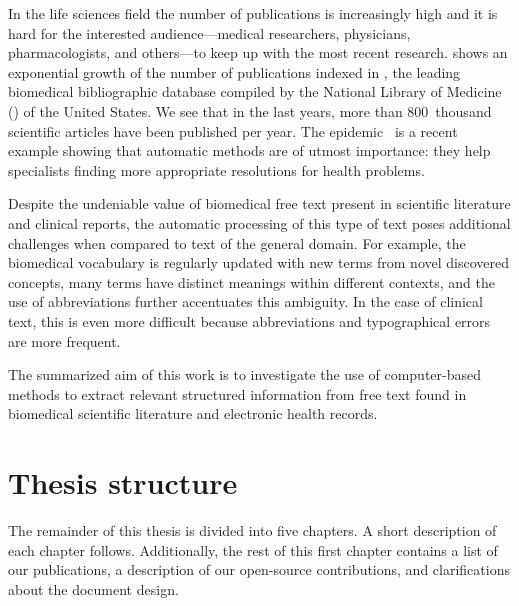 In the life sciences field the number of publications is increasingly high and it is hard for the interested audience---medical researchers, physicians, pharmacologists, and others---to keep up with the most recent research.
 shows an exponential growth of the number of publications indexed in , the leading biomedical bibliographic database compiled by the National Library of Medicine () of the United States.
We see that in the last years, more than 800~thousand scientific articles have been published per year.
The  epidemic~\parencite{velavan2020a} is a recent example showing that automatic methods are of utmost importance: they help specialists finding more appropriate resolutions for health problems.

Despite the undeniable value of biomedical free text present in scientific literature and clinical reports, the automatic processing of this type of text poses additional challenges when compared to text of the general domain.
For example, the biomedical vocabulary is regularly updated with new terms from novel discovered concepts, many terms have distinct meanings within different contexts, and the use of abbreviations further accentuates this ambiguity.
In the case of clinical text, this is even more difficult because abbreviations and typographical errors are more frequent.

The summarized aim of this work is to investigate the use of computer-based methods to extract relevant structured information from free text found in biomedical scientific literature and electronic health records.




\section{Thesis structure}

The remainder of this thesis is divided into five chapters.
A short description of each chapter follows.
Additionally, the rest of this first chapter contains a list of our publications, a description of our open-source contributions, and clarifications about the document design.

